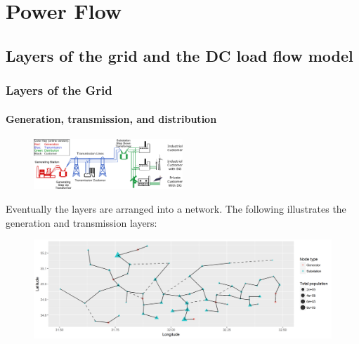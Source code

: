 \documentclass{beamer}
\begin{document}
\section{Power Flow}
\subsection{Layers of the grid and the DC load flow model}
\begin{frame}
\frametitle{Layers of the Grid}
\framesubtitle{Generation, transmission, and distribution}
\begin{figure}[h]
		\includegraphics[width=0.5\textwidth]{Aux_files/figure_1_Electricity_grid_simple_North_America.png}
	\label{fig:figure_1_Electricity_grid_simple_North_America}
\end{figure}
\pause
\footnotesize Eventually the layers are arranged into a network. The following illustrates the generation and transmission layers:
\vspace{-0.1in}
\begin{figure}
		\includegraphics[width=1\textwidth]{Aux_files/figure_2_example_grid.png}
	\label{fig:figure_2_example_grid}
\end{figure}
\end{frame}

\end{document}
